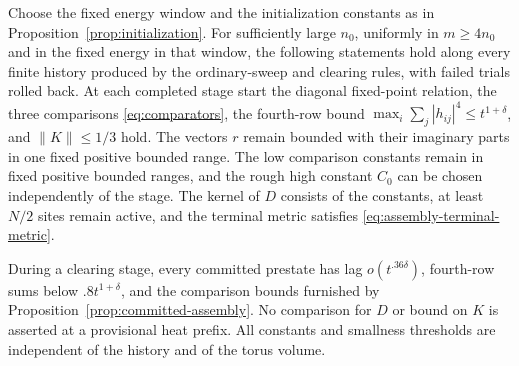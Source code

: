 \begin{proposition}
\label{prop:deterministic-induction}
Choose the fixed energy window and the initialization constants as in
Proposition~\ref{prop:initialization}. For sufficiently large $n_0$,
uniformly in $m\ge4n_0$ and in the fixed energy in that window, the
following statements hold along every finite history produced by the
ordinary-sweep and clearing rules, with failed trials rolled back.
At each completed stage start the diagonal fixed-point relation,
the three comparisons \eqref{eq:comparators}, the fourth-row bound
$\max_i\sum_j|h_{ij}|^4\le t^{1+\delta}$, and $\|K\|\le1/3$ hold.
The vectors $r$ remain bounded with their imaginary parts in one fixed
positive bounded range. The low comparison constants remain in fixed
positive bounded ranges, and the rough high constant $C_0$ can be
chosen independently of the stage. The kernel of $D$ consists of the
constants, at least $N/2$ sites remain active, and the terminal metric
satisfies \eqref{eq:assembly-terminal-metric}.

During a clearing stage, every committed prestate has lag
$o(t^{.36\delta})$, fourth-row sums below $.8t^{1+\delta}$, and the
comparison bounds furnished by Proposition~\ref{prop:committed-assembly}.
No comparison for $D$ or bound on $K$ is asserted at a provisional heat
prefix. All constants and smallness thresholds are independent of the
history and of the torus volume.
\end{proposition}

